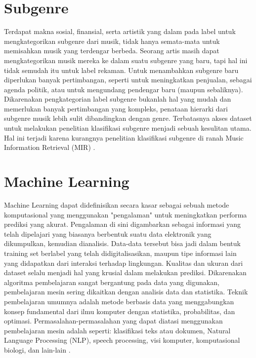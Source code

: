 \section{Subgenre}
\label{sec:subgenre}
Terdapat makna sosial, finansial, serta artistik yang dalam pada label untuk mengkategorikan subgenre dari musik, tidak hanya semata-mata untuk memisahkan musik yang terdengar berbeda. Seorang artis masih dapat mengkategorikan musik mereka ke dalam suatu subgenre yang baru, tapi hal ini tidak semudah itu untuk label rekaman. Untuk menambahkan subgenre baru diperlukan banyak pertimbangan, seperti untuk meningkatkan penjualan, sebagai agenda politik, atau untuk mengundang pendengar baru (maupun sebaliknya). Dikarenakan pengkategorian label subgenre bukanlah hal yang mudah dan memerlukan banyak pertimbangan yang kompleks, penataan hierarki dari subgenre musik lebih sulit dibandingkan dengan genre. Terbatasnya akses dataset untuk melakukan penelitian klasifikasi subgenre menjadi sebuah kesulitan utama. Hal ini terjadi karena kurangnya penelitian klasifikasi subgenre di ranah Music Information Retrieval (MIR) \citep{lefaivre2019characterizing}.

\section{Machine Learning}
\label{sec:machinelearning}


Machine Learning dapat didefinisikan secara kasar sebagai sebuah metode komputasional yang menggunakan "pengalaman" untuk meningkatkan performa prediksi yang akurat. Pengalaman di sini digambarkan sebagai informasi yang telah dipelajari yang biasanya berbentuk suatu data elektronik yang dikumpulkan, kemudian dianalisis. Data-data tersebut bisa jadi dalam bentuk training set berlabel yang telah didigitalisasikan, maupun tipe informasi lain yang didapatkan dari interaksi terhadap lingkungan. Kualitas dan ukuran dari dataset selalu menjadi hal yang krusial dalam melakukan prediksi. Dikarenakan algoritma pembelajaran sangat bergantung pada data yang digunakan, pembelajaran mesin sering dikaitkan dengan analisis data dan statistika. Teknik pembelajaran umumnya adalah metode berbasis data yang menggabungkan konsep fundamental dari ilmu komputer dengan statistika, probabilitas, dan optimasi. 
Permasalahan-permasalahan yang dapat diatasi menggunakan pembelajaran mesin adalah seperti: klasifikasi teks atau dokumen, Natural Language Processing (NLP), speech processing, visi komputer, komputasional biologi, dan lain-lain \citep{mohri2012foundations}.

